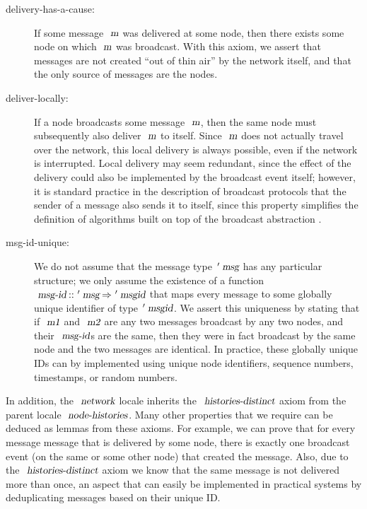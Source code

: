 \begin{description}
    \item[delivery-has-a-cause:] If some message $\isa{m}$ was delivered at some node, then there exists some node on which $\isa{m}$ was broadcast.
        With this axiom, we assert that messages are not created ``out of thin air'' by the network itself, and that the only source of messages are the nodes.
    \item[deliver-locally:] If a node broadcasts some message $\isa{m}$, then the same node must subsequently also deliver $\isa{m}$ to itself.
        Since $\isa{m}$ does not actually travel over the network, this local delivery is always possible, even if the network is interrupted.
        Local delivery may seem redundant, since the effect of the delivery could also be implemented by the broadcast event itself; however, it is standard practice in the description of broadcast protocols that the sender of a message also sends it to itself, since this property simplifies the definition of algorithms built on top of the broadcast abstraction \cite{Cachin:2011wt}.
    \item[msg-id-unique:] We do not assume that the message type $\isacharprime\isa{msg}$ has any particular structure; we only assume the existence of a function $\isa{msg-id} \mathbin{\isacharcolon\isacharcolon} \isacharprime\isa{msg} \mathbin{\isasymRightarrow} \isacharprime\isa{msgid}$ that maps every message to some globally unique identifier of type $\isacharprime\isa{msgid}$.
        We assert this uniqueness by stating that if $\isa{m1}$ and $\isa{m2}$ are any two messages broadcast by any two nodes, and their $\isa{msg-id}$s are the same, then they were in fact broadcast by the same node and the two messages are identical. 
        In practice, these globally unique IDs can by implemented using unique node identifiers, sequence numbers, timestamps, or random numbers.
\end{description}

In addition, the $\isa{network}$ locale inherits the $\isa{histories-distinct}$ axiom from the parent locale $\isa{node-histories}$.
Many other properties that we require can be deduced as lemmas from these axioms.
For example, we can prove that for every message message that is delivered by some node, there is exactly one broadcast event (on the same or some other node) that created the message.
Also, due to the $\isa{histories-distinct}$ axiom we know that the same message is not delivered more than once, an aspect that can easily be implemented in practical systems by deduplicating messages based on their unique ID.

